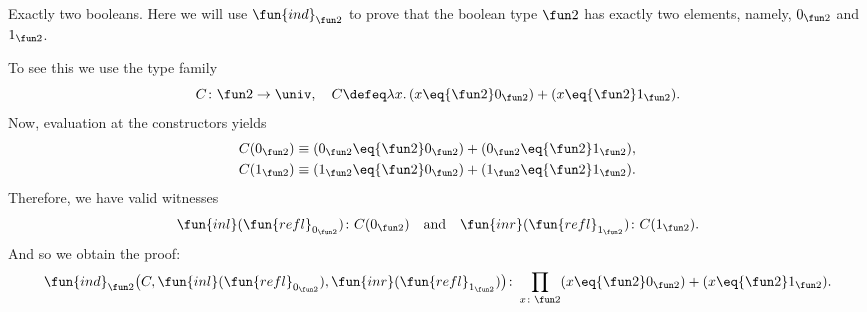 \begin{lpar}{Exactly two booleans.}\label{lpar:exactly-two-booleans}
    Here we will use $\fun{ind}_{\fun2}$ to prove that the boolean type $\fun2$ has exactly two elements, namely, $0_{\fun2}$ and $1_{\fun2}$.

    To see this we use the type family
    \[
        C\colon\fun2\to\univ,\quad
            C\defeq\lambda x.\,(x\eq{\fun2}0_{\fun2})+(x\eq{\fun2}1_{\fun2}).
    \]
    Now, evaluation at the constructors yields
    \begin{align*}
        C(0_{\fun2})&\equiv
            (0_{\fun2}\eq{\fun2}0_{\fun2})
                +(0_{\fun2}\eq{\fun2}1_{\fun2}),\\
        C(1_{\fun2})&\equiv
            (1_{\fun2}\eq{\fun2}0_{\fun2})
                +(1_{\fun2}\eq{\fun2}1_{\fun2}).
    \end{align*}
    Therefore, we have valid witnesses
    \[
        \fun{inl}(\fun{refl}_{0_{\fun2}})\colon C(0_{\fun2})
        \quad\text{and}\quad
        \fun{inr}(\fun{refl}_{1_{\fun2}})\colon C(1_{\fun2}).
    \]
    And so we obtain the proof:
    \[
        \fun{ind}_{\fun2}\bigl(C,
            \fun{inl}(\fun{refl}_{0_{\fun2}}),
            \fun{inr}(\fun{refl}_{1_{\fun2}})\bigr)
            \colon\prod_{x\colon\fun2}
                (x\eq{\fun2}0_{\fun2})+(x\eq{\fun2}1_{\fun2}).
    \]
\end{lpar}

